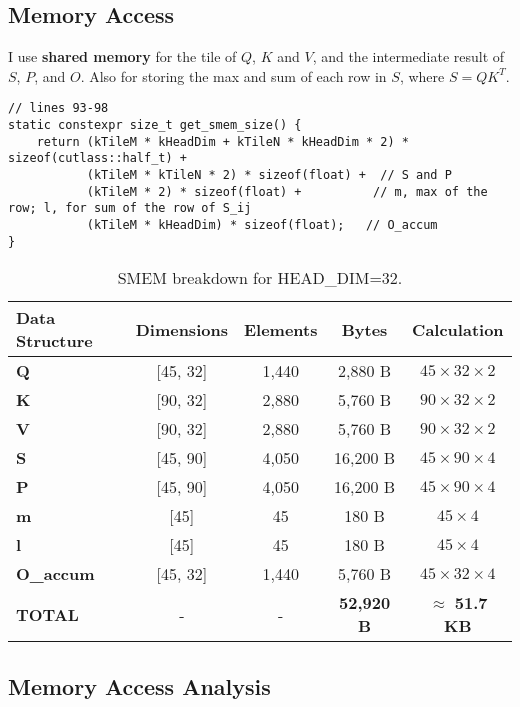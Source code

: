 \documentclass[11pt]{article}
\begin{document}
\subsection{Memory Access}

I use \textbf{shared memory} for the tile of $Q$, $K$ and $V$, and the intermediate result of $S$, $P$, and $O$. Also for storing the max and sum of each row in $S$, where $S=QK^T$.
\begin{lstlisting}
// lines 93-98
static constexpr size_t get_smem_size() {
    return (kTileM * kHeadDim + kTileN * kHeadDim * 2) * sizeof(cutlass::half_t) +
           (kTileM * kTileN * 2) * sizeof(float) +  // S and P
           (kTileM * 2) * sizeof(float) +          // m, max of the row; l, for sum of the row of S_ij
           (kTileM * kHeadDim) * sizeof(float);   // O_accum
}
\end{lstlisting}

\begin{table}[h!]
\centering
\begin{tabular}{lcccc}
\toprule
\textbf{Data Structure} & \textbf{Dimensions} & \textbf{Elements} & \textbf{Bytes} & \textbf{Calculation} \\
\midrule
\textbf{Q} & [45, 32] & 1,440 & 2,880 B & $45 \times 32 \times 2$ \\
\textbf{K} & [90, 32] & 2,880 & 5,760 B & $90 \times 32 \times 2$ \\
\textbf{V} & [90, 32] & 2,880 & 5,760 B & $90 \times 32 \times 2$ \\
\textbf{S} & [45, 90] & 4,050 & 16,200 B & $45 \times 90 \times 4$ \\
\textbf{P} & [45, 90] & 4,050 & 16,200 B & $45 \times 90 \times 4$ \\
\textbf{m} & [45] & 45 & 180 B & $45 \times 4$ \\
\textbf{l} & [45] & 45 & 180 B & $45 \times 4$ \\
\textbf{O\_accum} & [45, 32] & 1,440 & 5,760 B & $45 \times 32 \times 4$ \\
\midrule
\textbf{TOTAL} & - & - & \textbf{52,920 B} & $\approx$ \textbf{51.7 KB} \\
\bottomrule
\end{tabular}
\caption{SMEM breakdown for HEAD\_DIM=32.}
\end{table}

\subsection{Memory Access Analysis}
\end{document}
